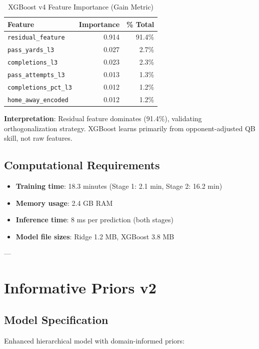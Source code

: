 \begin{table}[h]
\centering
\caption{XGBoost v4 Feature Importance (Gain Metric)}
\label{tab:xgboost-v4-importance}
\begin{tabular}{lrr}
\toprule
\textbf{Feature} & \textbf{Importance} & \textbf{\% Total} \\
\midrule
\texttt{residual\_feature} & 0.914 & 91.4\% \\
\texttt{pass\_yards\_l3} & 0.027 & 2.7\% \\
\texttt{completions\_l3} & 0.023 & 2.3\% \\
\texttt{pass\_attempts\_l3} & 0.013 & 1.3\% \\
\texttt{completions\_pct\_l3} & 0.012 & 1.2\% \\
\texttt{home\_away\_encoded} & 0.012 & 1.2\% \\
\bottomrule
\end{tabular}
\end{table}

\textbf{Interpretation}: Residual feature dominates (91.4\%), validating orthogonalization strategy. XGBoost learns primarily from opponent-adjusted QB skill, not raw features.

\subsection{Computational Requirements}

\begin{itemize}
\item \textbf{Training time}: 18.3 minutes (Stage 1: 2.1 min, Stage 2: 16.2 min)
\item \textbf{Memory usage}: 2.4 GB RAM
\item \textbf{Inference time}: 8 ms per prediction (both stages)
\item \textbf{Model file sizes}: Ridge 1.2 MB, XGBoost 3.8 MB
\end{itemize}

---

\section{Informative Priors v2}

\subsection{Model Specification}

Enhanced hierarchical model with domain-informed priors:

